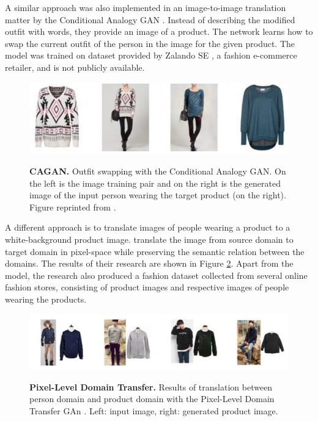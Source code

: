 \documentclass[12pt]{report}
\begin{document}
A similar approach was also implemented in an image-to-image translation matter by the Conditional Analogy GAN \cite{jetchev_conditional_2017}. Instead of describing the modified outfit with words, they provide an image of a product. The network learns how to swap the current outfit of the person in the image for the given product. The model was trained on dataset provided by Zalando SE \cite{zalando_damenmode_nodate}, a fashion e-commerce retailer, and is not publicly available.

\begin{figure}[h]
\centering
{\includegraphics[width=.8\linewidth]{03_analysis/related/cagan}}
\caption{\label{fig:swapgan} \textbf{CAGAN.} Outfit swapping with the Conditional Analogy GAN. On the left is the image training pair and on the right is the generated  image of the input person wearing the target product (on the right). Figure reprinted from \cite{jetchev_conditional_2017}.}
\end{figure}

\pagebreak
A different approach is to translate images of people wearing a product to a white-background product image. \cite{yoo_pixel-level_2016} translate the image from source domain to target domain in pixel-space while preserving the semantic relation between the domains. The results of their research are shown in Figure \ref{fig:pixeldtgan}. Apart from the model, the research also produced a fashion dataset collected from several online fashion stores, consisting of product images and respective images of people wearing the products.

\begin{figure}[h]
\centering
{\includegraphics[width=\linewidth]{03_analysis/related/pixeldtgan}}
\caption{\label{fig:pixeldtgan} \textbf{Pixel-Level Domain Transfer.} Results of translation between person domain and product domain with the Pixel-Level Domain Transfer GAn \cite{yoo_pixel-level_2016}. Left: input image, right: generated product image.}
\end{figure}
\end{document}
